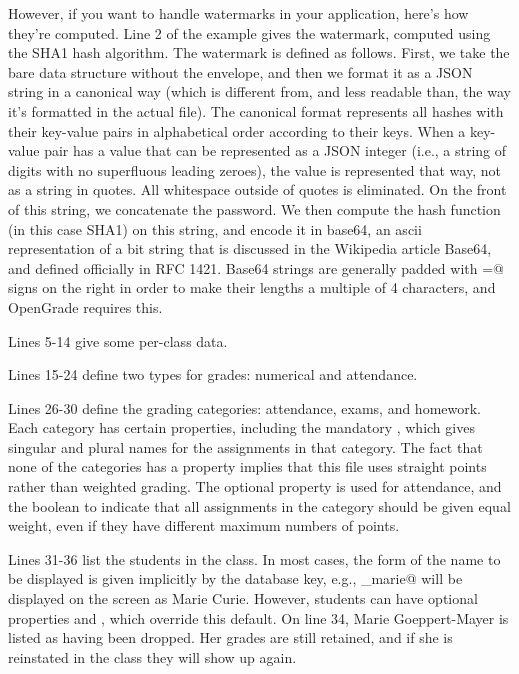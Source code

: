 \documentclass{opengrade_doc}
\begin{document}
However, if you want to handle watermarks in your application, here's how they're computed.
Line 2 of the example gives the watermark, computed using the SHA1 hash algorithm.
The watermark is defined as follows. First, we take the bare data structure
without the envelope, and then we format it as a JSON string in a canonical way (which is different
from, and less readable than, the way it's formatted in the actual file).
The canonical format represents all hashes with their key-value pairs
in alphabetical order according to their keys. When a key-value pair has
a value that can be represented as a JSON integer (i.e., a string of digits
with no superfluous leading zeroes), the value is represented that way, not
as a string in quotes. All whitespace outside of quotes is eliminated.
On the front of this string, we concatenate the password. We then compute the
hash function (in this case SHA1) on this string, and encode it in base64,
an ascii representation of a bit string that is discussed in the Wikipedia
article Base64, and defined officially in RFC 1421.
Base64 strings are generally padded with \verb@=@ signs on the right in order
to make their lengths a multiple of 4 characters, and OpenGrade requires this.

Lines 5-14 give some per-class data.

Lines 15-24 define two types for grades: numerical and attendance.

Lines 26-30 define the grading categories: attendance, exams, and homework.
Each category has certain properties, including the mandatory \verb@catname@,
which gives singular and plural names for the assignments in that category.
The fact that none of the categories has a \verb@weight@ property implies
that this file uses straight points rather than weighted grading.
The optional property \verb@type@ is used for attendance, and the boolean \verb@normalize@
to indicate that all assignments in the category should be given equal weight, even if
they have different maximum numbers of points.

Lines 31-36 list the students in the class. In most cases, the form of the name
to be displayed is given implicitly by the database key, e.g., \verb@curie_marie@
will be displayed on the screen as Marie Curie. However, students can have
optional properties \verb@first@ and \verb@last@, which override this default.
On line 34, Marie Goeppert-Mayer is listed as having been dropped. Her grades are
still retained, and if she is reinstated in the class they will show up again.
\end{document}
